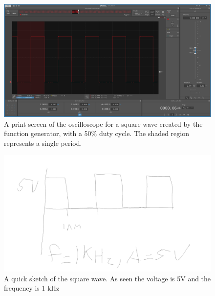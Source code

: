 \documentclass[10pt]{article}
\begin{document}
\begin{center}
		\begin{figure}[H]
			\centering
			\includegraphics[scale = 0.35]{supplemental/squarewave.png}
			\caption{A print screen of the oscilloscope for a square wave created by the function generator, with a 50\% duty cycle. The shaded region represents a single period.}
		\end{figure}
	\begin{figure}[H]
		\centering
		\includegraphics[scale = .8]{supplemental/ELEClabsketch.png}
		\caption{A quick sketch of the square wave. As seen the voltage is 5V and the frequency is 1 kHz}
	\end{figure}
	\end{center}


	
		
	\medskip
	
	
\end{document}
